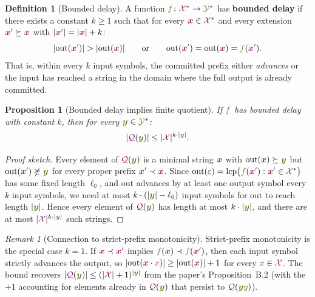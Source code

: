 \documentclass{article}
\newcommand{\defn}[1]{\textbf{#1}}
\newcommand{\Quotient}{{\color{TokenColor}\mathcal{Q}}}
\newcommand{\transFnSym}[0]{f}
\newcommand{\transFn}{\ensuremath{{\color{CharacterColor}\transFnSym}}\xspace}
\newcommand{\srcSym}{{\color{TokenColor}x}}
\newcommand{\srcStr}{\ensuremath{{\color{TokenColor}\boldsymbol{x}}}\xspace}
\newcommand{\srcStrp}{\ensuremath{{\color{TokenColor}\boldsymbol{x}^\prime}}\xspace}
\newcommand{\tgtSym}{{\color{CharacterColor}y}}
\newcommand{\tgtStr}{{\color{CharacterColor}\boldsymbol{y}}}
\newcommand{\srcAlphabet}[0]{{\color{TokenColor}\ensuremath{\mathcal{X}}}\xspace}
\newcommand{\tgtAlphabet}[0]{{\color{CharacterColor}\ensuremath{\mathcal{Y}}}\xspace}
\newcommand{\srcStrings}[0]{\ensuremath{\srcAlphabet^*}\xspace}
\newcommand{\tgtStrings}[0]{\ensuremath{\tgtAlphabet^*}\xspace}
\newcommand{\committed}{\mathrm{out}}
\newcommand{\lcp}{\mathrm{lcp}}
\theoremstyle{plain}
\newtheorem{proposition}[theorem]{Proposition}
\theoremstyle{definition}
\newtheorem{definition}[theorem]{Definition}
\theoremstyle{remark}
\newtheorem{remark}[theorem]{Remark}
\begin{document}
\begin{definition}[Bounded delay]
\label{def:bounded-delay}
A function $\transFn \colon \srcStrings \to \tgtStrings$ has \defn{bounded delay}
if there exists a constant $k \geq 1$ such that for every $\srcStr \in
\srcStrings$ and every extension $\srcStrp \succeq \srcStr$ with $|\srcStrp| =
|\srcStr| + k$:
\begin{equation}
  |\committed(\srcStrp)| > |\committed(\srcStr)|
  \qquad\text{or}\qquad
  \committed(\srcStrp) = \committed(\srcStr) = \transFn(\srcStrp).
\end{equation}
That is, within every $k$ input symbols, the committed prefix either
\emph{advances} or the input has reached a string in the domain where the full
output is already committed.
\end{definition}

\begin{proposition}[Bounded delay implies finite quotient]
\label{prop:delay-quotient}
If $\transFn$ has bounded delay with constant $k$, then for every $\tgtStr \in \tgtStrings$:
\[
  |\Quotient(\tgtStr)| \leq |\srcAlphabet|^{k \cdot |\tgtStr|}.
\]
\end{proposition}
\begin{proof}[Proof sketch]
Every element of $\Quotient(\tgtStr)$ is a minimal string $\srcStr$ with
$\committed(\srcStr) \succeq \tgtStr$ but $\committed(\srcStrp) \not\succeq
\tgtStr$ for every proper prefix $\srcStrp \prec \srcStr$.  Since
$\committed(\varepsilon) = \lcp\{\transFn(\srcStrp) : \srcStrp \in
\srcStrings\}$ has some fixed length $\ell_0$, and $\committed$ advances by at
least one output symbol every $k$ input symbols, we need at most $k \cdot
(|\tgtStr| - \ell_0)$ input symbols for $\committed$ to reach length $|\tgtStr|$.
Hence every element of $\Quotient(\tgtStr)$ has length at most $k \cdot
|\tgtStr|$, and there are at most $|\srcAlphabet|^{k \cdot |\tgtStr|}$ such
strings.
\end{proof}

\begin{remark}[Connection to strict-prefix monotonicity]
Strict-prefix monotonicity is the special case $k = 1$.  If $\srcStr \prec
\srcStrp$ implies $\transFn(\srcStr) \prec \transFn(\srcStrp)$, then each
input symbol strictly advances the output, so
$|\committed(\srcStr \cdot \srcSym)| \geq |\committed(\srcStr)| + 1$ for
every $\srcSym \in \srcAlphabet$.  The bound recovers
$|\Quotient(\tgtStr)| \leq (|\srcAlphabet| + 1)^{|\tgtStr|}$ from the
paper's Proposition~B.2 (with the $+1$ accounting for elements
already in $\Quotient(\tgtStr)$ that persist to $\Quotient(\tgtStr\tgtSym)$).
\end{remark}
\end{document}
